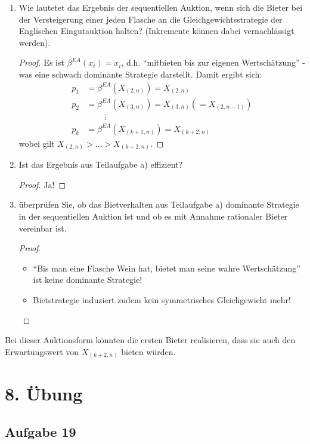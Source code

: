 \documentclass[12pt]{extreport} %
\theoremstyle{named}
\theoremstyle{nnamed}
\theoremstyle{itshape}
\theoremstyle{normal}
\begin{document}
\begin{enumerate}
	\item Wie lautetet das Ergebnis der sequentiellen Auktion, wenn sich die Bieter bei der Versteigerung einer jeden Flasche an die Gleichgewichtsstrategie der Englischen Eingutauktion halten? (Inkremente können dabei vernachlässigt werden).
		\begin{proof}
			Es ist $\beta^{EA}(x_i) = x_i$, d.h. \enquote{mitbieten bis zur eigenen Wertschätzung} - was eine schwach dominante Strategie darstellt. Damit ergibt sich:
			\begin{align*}
				p_1 & = \beta^{EA}\left( X_{(2,n)} \right) = X_{(2,n)} \\
				p_2 & = \beta^{EA}\left( X_{(3,n)} \right) = X_{(3,n)} \left( = X_{(2,n-1)} \right) \\
				& ~\qquad \vdots \\
				p_k & = \beta^{EA}\left( X_{(k+1, n)} \right) = X_{(k+2,n)}
			\end{align*}
			wobei gilt $X_{(2,n)} > \dotsc > X_{(k+2,n)}$.
		\end{proof}
	\item Ist das Ergebnis aus Teilaufgabe a) effizient?
		\begin{proof}
			Ja!
		\end{proof}
	\item überprüfen Sie, ob das Bietverhalten aus Teilaufgabe a) dominante Strategie in der sequentiellen Auktion ist und ob es mit Annahme rationaler Bieter vereinbar ist.
		\begin{proof} ~\
			\begin{itemize}
				\item \enquote{Bis man eine Flasche Wein hat, bietet man seine wahre Wertschätzung} ist keine dominante Strategie!
				\item Bietstrategie induziert zudem kein symmetrisches Gleichgewicht mehr!
			\end{itemize}
		\end{proof}
\end{enumerate}

Bei dieser Auktionsform könnten die ersten Bieter realisieren, dass sie auch den Erwartungswert von $X_{(k+2,n)}$ bieten würden.

\section*{8. Übung}

\subsection*{Aufgabe 19}
\end{document}
